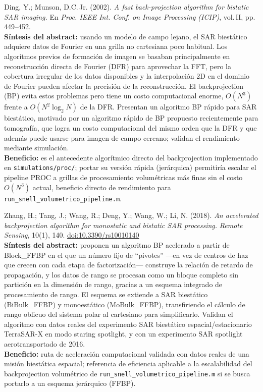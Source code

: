 \documentclass[11pt,a4paper]{article}
\begin{document}
\begin{enumerate}[label=\textbf{[B\arabic*]}, leftmargin=2.2cm, itemsep=10pt]
\item Ding, Y.; Munson, D.C.\,Jr. (2002). \textit{A fast back-projection
algorithm for bistatic SAR imaging.} En \emph{Proc. IEEE Int. Conf. on Image
Processing (ICIP)}, vol.\,II, pp.\,449--452. \cite{ding2002}\\
\textbf{Síntesis del abstract:} usando un modelo de campo lejano, el SAR
biestático adquiere datos de Fourier en una grilla no cartesiana poco
habitual. Los algoritmos previos de formación de imagen se basaban
principalmente en reconstrucción directa de Fourier (DFR) para aprovechar
la FFT, pero la cobertura irregular de los datos disponibles y la
interpolación 2D en el dominio de Fourier pueden afectar la precisión de la
reconstrucción. El backprojection (BP) evita estos problemas pero tiene un
costo computacional enorme, $O(N^3)$ frente a $O(N^2\log_2 N)$ de la DFR.
Presentan un algoritmo BP rápido para SAR biestático, motivado por un
algoritmo rápido de BP propuesto recientemente para tomografía, que logra
un costo computacional del mismo orden que la DFR y que además puede
usarse para imagen de campo cercano; validan el rendimiento mediante
simulación.\\
\textbf{Beneficio:} es el antecedente algorítmico directo del backprojection
implementado en \texttt{simulations/proc/}; portar su versión rápida
(jerárquica) permitiría escalar el pipeline PROC a grillas de procesamiento
volumétricas más finas sin el costo $O(N^3)$ actual, beneficio directo de
rendimiento para \texttt{run\_snell\_volumetrico\_pipeline.m}.

\item Zhang, H.; Tang, J.; Wang, R.; Deng, Y.; Wang, W.; Li, N. (2018).
\textit{An accelerated backprojection algorithm for monostatic and bistatic
SAR processing.} \emph{Remote Sensing}, 10(1), 140.
\href{https://doi.org/10.3390/rs10010140}{doi:10.3390/rs10010140}
\cite{zhang2018}\\
\textbf{Síntesis del abstract:} proponen un algoritmo BP acelerado a partir
de Block\_FFBP en el que un número fijo de ``pivotes'' —en vez de centros de
haz que crecen con cada etapa de factorización— construye la relación de
retardo de propagación, y los datos de rango se procesan como un bloque
completo sin partición en la dimensión de rango, gracias a un esquema
integrado de procesamiento de rango. El esquema se extiende a SAR
biestático (BiBulk\_FFBP) y monoestático (MoBulk\_FFBP), transfiriendo el
cálculo de rango oblicuo del sistema polar al cartesiano para simplificarlo.
Validan el algoritmo con datos reales del experimento SAR biestático
espacial/estacionario TerraSAR-X en modo staring spotlight, y con un
experimento SAR spotlight aerotransportado de 2016.\\
\textbf{Beneficio:} ruta de aceleración computacional validada con datos
reales de una misión biestática espacial; referencia de eficiencia
aplicable a la escalabilidad del backprojection volumétrico de
\texttt{run\_snell\_volumetrico\_pipeline.m} si se busca portarlo a un
esquema jerárquico (FFBP).


\end{enumerate}
\end{document}
